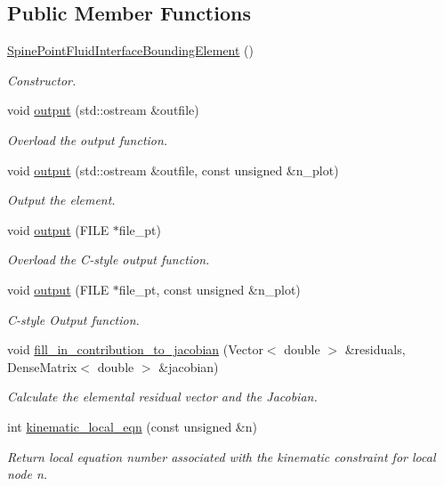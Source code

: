 \subsection*{Public Member Functions}
\begin{DoxyCompactItemize}
\item 
\hyperlink{classoomph_1_1SpinePointFluidInterfaceBoundingElement_a4cda221f4ee0528cc89076809f54c64e}{Spine\+Point\+Fluid\+Interface\+Bounding\+Element} ()
\begin{DoxyCompactList}\small\item\em Constructor. \end{DoxyCompactList}\item 
void \hyperlink{classoomph_1_1SpinePointFluidInterfaceBoundingElement_ac35833173407cde9359c8163a0eba35c}{output} (std\+::ostream \&outfile)
\begin{DoxyCompactList}\small\item\em Overload the output function. \end{DoxyCompactList}\item 
void \hyperlink{classoomph_1_1SpinePointFluidInterfaceBoundingElement_a05a5383f07c840e07d8c2279cce80aaa}{output} (std\+::ostream \&outfile, const unsigned \&n\+\_\+plot)
\begin{DoxyCompactList}\small\item\em Output the element. \end{DoxyCompactList}\item 
void \hyperlink{classoomph_1_1SpinePointFluidInterfaceBoundingElement_a2435b4b786ede183808834b4d0c5210c}{output} (F\+I\+LE $\ast$file\+\_\+pt)
\begin{DoxyCompactList}\small\item\em Overload the C-\/style output function. \end{DoxyCompactList}\item 
void \hyperlink{classoomph_1_1SpinePointFluidInterfaceBoundingElement_a75a530620bfa2a983fec2e1c7f801db2}{output} (F\+I\+LE $\ast$file\+\_\+pt, const unsigned \&n\+\_\+plot)
\begin{DoxyCompactList}\small\item\em C-\/style Output function. \end{DoxyCompactList}\item 
void \hyperlink{classoomph_1_1SpinePointFluidInterfaceBoundingElement_afe714a2a2b9f741558376cc144e19232}{fill\+\_\+in\+\_\+contribution\+\_\+to\+\_\+jacobian} (Vector$<$ double $>$ \&residuals, Dense\+Matrix$<$ double $>$ \&jacobian)
\begin{DoxyCompactList}\small\item\em Calculate the elemental residual vector and the Jacobian. \end{DoxyCompactList}\item 
int \hyperlink{classoomph_1_1SpinePointFluidInterfaceBoundingElement_a7c1c2f31b1d9f9c925889ad199a78947}{kinematic\+\_\+local\+\_\+eqn} (const unsigned \&n)
\begin{DoxyCompactList}\small\item\em Return local equation number associated with the kinematic constraint for local node n. \end{DoxyCompactList}\end{DoxyCompactItemize}
